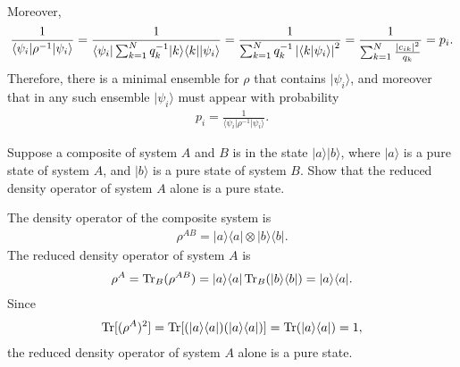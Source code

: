 \documentclass[en]{sol-man}
\begin{document}
\begin{pf}
\begin{align}
    \end{align}
    Moreover,
    \begin{align}
        \frac{1}{\langle\psi_i\rvert\rho^{-1}\lvert\psi_i\rangle}=\frac{1}{\langle\psi_i\rvert\sum_{k=1}^Nq_k^{-1}\lvert k\rangle\langle k\rvert\lvert\psi_i\rangle}=\frac{1}{\sum_{k=1}^Nq_k^{-1}\left\lvert\langle k\vert\psi_i\rangle\right\rvert^2}=\frac{1}{\sum_{k=1}^N\frac{\left\lvert c_{ik}\right\rvert^2}{q_k}}=p_i.
    \end{align}
    Therefore, there is a minimal ensemble for $\rho$ that contains $\lvert\psi_i\rangle$, and moreover that in any such ensemble $\lvert\psi_i\rangle$ must appear with probability
    \begin{align}
        p_i=\frac{1}{\langle\psi_i\rvert\rho^{-1}\lvert\psi_i\rangle}.
    \end{align}
\end{pf}

\begin{exe}
    Suppose a composite of system $A$ and $B$ is in the state $\lvert a\rangle\lvert b\rangle$, where $\lvert a\rangle$ is a pure state of system $A$, and $\lvert b\rangle$ is a pure state of system $B$. Show that the reduced density operator of system $A$ alone is a pure state.
\end{exe}
\begin{pf}
    The density operator of the composite system is
    \begin{align}
        \rho^{AB}=\lvert a\rangle\langle a\rvert\otimes\lvert b\rangle\langle b\rvert.
    \end{align}
    The reduced density operator of system $A$ is
    \begin{align}
        \rho^A=\operatorname{Tr}_B(\rho^{AB})=\lvert a\rangle\langle a\rvert\operatorname{Tr}_B(\lvert b\rangle\langle b\rvert)=\lvert a\rangle\langle a\rvert.
    \end{align}
    Since
    \begin{align}
        \operatorname{Tr}[(\rho^A)^2]=\operatorname{Tr}[(\lvert a\rangle\langle a\rvert)(\lvert a\rangle\langle a\rvert)]=\operatorname{Tr}(\lvert a\rangle\langle a\rvert)=1,
    \end{align}
    the reduced density operator of system $A$ alone is a pure state.
\end{pf}
\end{document}
